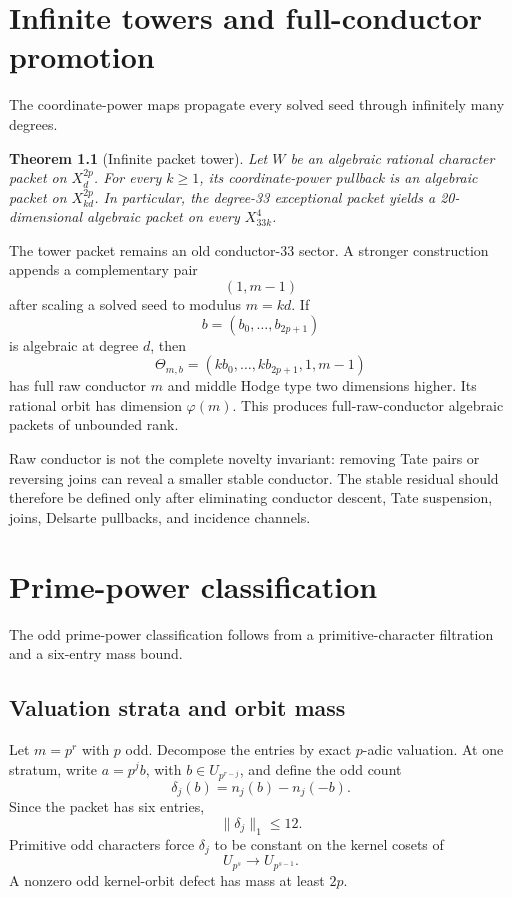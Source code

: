 \documentclass[11pt,oneside]{book}
\newtheorem{theorem}{Theorem}[chapter]
\theoremstyle{definition}
\theoremstyle{remark}
\begin{document}
\chapter{Infinite towers and full-conductor promotion}
The coordinate-power maps propagate every solved seed through infinitely many degrees.

\begin{theorem}[Infinite packet tower]
Let \(W\) be an algebraic rational character packet on \(X_d^{2p}\). For every \(k\ge1\), its coordinate-power pullback is an algebraic packet on \(X_{kd}^{2p}\). In particular, the degree-33 exceptional packet yields a 20-dimensional algebraic packet on every \(X_{33k}^4\).
\end{theorem}

The tower packet remains an old conductor-33 sector. A stronger construction appends a complementary pair
\[
(1,m-1)
\]
after scaling a solved seed to modulus \(m=kd\). If
\[
b=(b_0,\ldots,b_{2p+1})
\]
is algebraic at degree \(d\), then
\[
\Theta_{m,b}=(kb_0,\ldots,kb_{2p+1},1,m-1)
\]
has full raw conductor \(m\) and middle Hodge type two dimensions higher. Its rational orbit has dimension \(\varphi(m)\). This produces full-raw-conductor algebraic packets of unbounded rank.

Raw conductor is not the complete novelty invariant: removing Tate pairs or reversing joins can reveal a smaller stable conductor. The stable residual should therefore be defined only after eliminating conductor descent, Tate suspension, joins, Delsarte pullbacks, and incidence channels.


\chapter{Prime-power classification}
The odd prime-power classification follows from a primitive-character filtration and a six-entry mass bound.

\section{Valuation strata and orbit mass}
Let \(m=p^r\) with \(p\) odd. Decompose the entries by exact \(p\)-adic valuation. At one stratum, write \(a=p^jb\), with \(b\in U_{p^{r-j}}\), and define the odd count
\[
\delta_j(b)=n_j(b)-n_j(-b).
\]
Since the packet has six entries,
\[
\|\delta_j\|_1\le 12.
\tag{12.1}
\]
Primitive odd characters force \(\delta_j\) to be constant on the kernel cosets of
\[
U_{p^s}\to U_{p^{s-1}}.
\]
A nonzero odd kernel-orbit defect has mass at least \(2p\).
\end{document}
